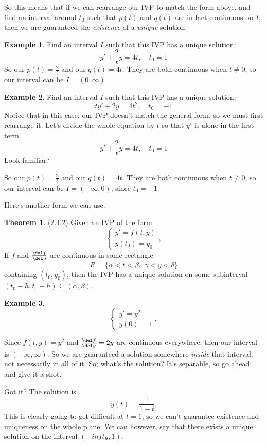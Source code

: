\documentclass[a5paper]{article}
\theoremstyle{definition}%
\newtheorem*{theorem*}{Theorem} %
\newtheorem*{example*}{Example}
\numberwithin{exercise}{section}
\theoremstyle{remark}%
\begin{document}
So this means that if we can rearrange our IVP to match the form above, and find an interval around $t_0$ such that $p(t)$ and $q(t)$ are in fact continuous on $I$, then we are guaranteed the \emph{existence} of a \emph{unique }solution. 

\begin{example*}
Find an interval $I$ such that this IVP has a unique solution:
\[y'+\frac{2}{t}y=4t, \quad t_0=1\]
So our $p(t)=\frac{2}{t}$ and our $q(t)=4t$. They are both continuous when $t\neq0$, so our interval can be $I=(0,\infty)$. 
\end{example*}

\begin{example*}
Find an interval $I$ such that this IVP has a unique solution:
\[ty'+2y=4t^2, \quad t_0=-1\]
Notice that in this case, our IVP doesn't match the general form, so we must first rearrange it. Let's divide the whole equation by $t$ so that $y'$ is alone in the first term. 
\[y'+\frac{2}{t}y=4t, \quad t_0=1\]
Look familiar?

So our $p(t)=\frac{2}{t}$ and our $q(t)=4t$. They are both continuous when $t\neq0$, so our interval can be $I=(-\infty,0)$, since $t_0=-1$. 
\end{example*}

Here's another form we can use. 

\begin{highlight}
\begin{theorem*}(2.4.2)
Given an IVP of the form 
\[
\begin{cases}
y'=f(t,y)\\
y(t_0)=y_0
\end{cases},
\]
If $f$ and $\frac{\del f}{\del y}$ are continuous in some rectangle
\[R=\{\alpha<t<\beta, \, \, \gamma<y<\delta\}\]
containing $(t_0, y_0)$, then the IVP has a unique solution on some subinterval $(t_0-h, t_0+h)\subseteq(\alpha,\beta)$. 

\end{theorem*}
\end{highlight}

\begin{example*}
\[
\begin{cases}
y'=y^2\\
y(0)=1
\end{cases},
\]

\noindent Since $f(t,y)=y^2$ and $\frac{\del f}{\del y}=2y$ are continuous everywhere, then our interval is $(-\infty,\infty)$. So we are guaranteed a solution somewhere \emph{inside} that interval, not necessarily in all of it. So; what's the solution? It's separable, so go ahead and give it a shot. 

\mbox{}

\noindent Got it? The solution is 
\[y(t)=\frac{1}{1-t}.\]
This is clearly going to get difficult at $t=1$, so we can't guarantee existence and uniqueness on the whole plane. We can however, say that there exists a unique solution on the interval $(-infty, 1)$. 
\end{example*}
\end{document}

